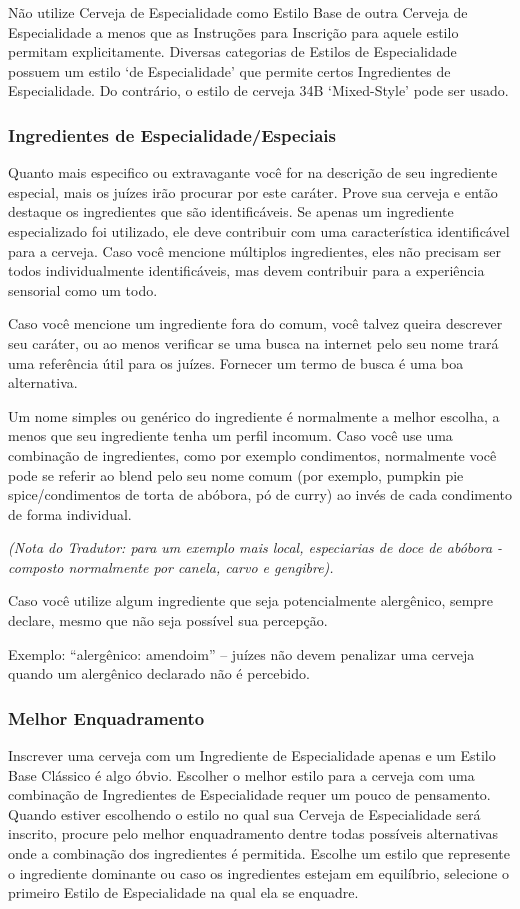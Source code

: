 Não utilize Cerveja de Especialidade como Estilo Base de outra Cerveja de Especialidade a menos que as Instruções para Inscrição para aquele estilo permitam explicitamente. Diversas categorias de Estilos de Especialidade possuem um estilo ‘de Especialidade’ que permite certos Ingredientes de Especialidade. Do contrário, o estilo de cerveja 34B ‘Mixed-Style’ pode ser usado.

\subsubsection*{Ingredientes de Especialidade/Especiais}
Quanto mais especifico ou extravagante você for na descrição de seu ingrediente especial, mais os juízes irão procurar por este caráter. Prove sua cerveja e então destaque os ingredientes que são identificáveis. Se apenas um ingrediente especializado foi utilizado, ele deve contribuir com uma característica identificável para a cerveja. Caso você mencione múltiplos ingredientes, eles não precisam ser todos individualmente identificáveis, mas devem contribuir para a experiência sensorial como um todo.

Caso você mencione um ingrediente fora do comum, você talvez queira descrever seu caráter, ou ao menos verificar se uma busca na internet pelo seu nome trará uma referência útil para os juízes. Fornecer um termo de busca é uma boa alternativa.

Um nome simples ou genérico do ingrediente é normalmente a melhor escolha, a menos que seu ingrediente tenha um perfil incomum. Caso você use uma combinação de ingredientes, como por exemplo condimentos, normalmente você pode se referir ao blend pelo seu nome comum (por exemplo, pumpkin pie spice/condimentos de torta de abóbora, pó de curry) ao invés de cada condimento de forma individual.

\textit{(Nota do Tradutor: para um exemplo mais local, especiarias de doce de abóbora - composto normalmente por canela, carvo e gengibre).}

Caso você utilize algum ingrediente que seja potencialmente alergênico, sempre declare, mesmo que não seja possível sua percepção.

Exemplo: “alergênico: amendoim” – juízes não devem penalizar uma cerveja quando um alergênico declarado não é percebido.

\subsubsection*{Melhor Enquadramento}
Inscrever uma cerveja com um Ingrediente de Especialidade apenas e um Estilo Base Clássico é algo óbvio. Escolher o melhor estilo para a cerveja com uma combinação de Ingredientes de Especialidade requer um pouco de pensamento. Quando estiver escolhendo o estilo no qual sua Cerveja de Especialidade será inscrito, procure pelo melhor enquadramento dentre todas possíveis alternativas onde a combinação dos ingredientes é permitida. Escolhe um estilo que represente o ingrediente dominante ou caso os ingredientes estejam em equilíbrio, selecione o primeiro Estilo de Especialidade na qual ela se enquadre.

